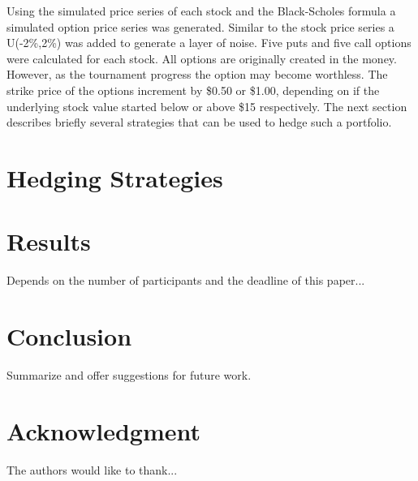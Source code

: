 \documentclass[conference, draftcls]{IEEEtran}
\begin{document}
Using the simulated price series of each stock and the Black-Scholes formula a simulated option price series was generated. Similar to the stock price series a U(-2\%,2\%) was added to generate a layer of noise. Five puts and five call options were calculated for each stock. All options are originally created in the money. However, as the tournament progress the option may become worthless. The strike price of the options increment by \$0.50 or \$1.00, depending on if the underlying stock value started below or above \$15 respectively. The next section describes briefly several strategies that can be used to hedge such a portfolio.

\section{Hedging Strategies}

\section{Results}
Depends on the number of participants and the deadline of this paper...

\section{Conclusion}
Summarize and offer suggestions for future work.

\section*{Acknowledgment}
The authors would like to thank...



\end{document}
